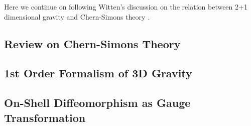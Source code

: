 Here we continue on following Witten's discussion on the relation between 2+1 dimensional gravity and Chern-Simons theory \cite{witten21Dimensional1988}. 

\subsection{Review on Chern-Simons Theory}



\subsection{1st Order Formalism of 3D Gravity}



\subsection{On-Shell Diffeomorphism as Gauge Transformation}
